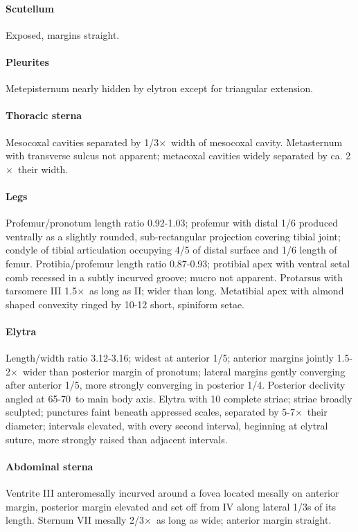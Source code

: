 \documentclass[fleqn,10pt,lineno]{wlpeerj} %
\newcommand{\td}{\textdegree~}
\newcommand{\x}{$\times$~}
\begin{document}
			\paragraph{Scutellum}
				Exposed, margins straight.
			\paragraph{Pleurites}
				Metepisternum nearly hidden by elytron except for triangular extension.
			\paragraph{Thoracic sterna} 
				Mesocoxal cavities separated by 1/3\x width of mesocoxal cavity. 
				Metasternum with transverse sulcus not apparent; metacoxal cavities widely separated by ca. 2\x their width.
			\paragraph{Legs}
				Profemur/pronotum length ratio 0.92-1.03; profemur with distal 1/6 produced ventrally as a slightly rounded, sub-rectangular projection covering tibial joint; condyle of tibial articulation occupying 4/5 of distal surface and 1/6 length of femur. 
				Protibia/profemur length ratio 0.87-0.93; protibial apex with ventral setal comb recessed in a subtly incurved groove; mucro not apparent. 
				Protarsus with tarsomere III 1.5\x as long as II; wider than long. 
				Metatibial apex with almond shaped convexity ringed by 10-12 short, spiniform setae.
			\paragraph{Elytra}
				Length/width ratio 3.12-3.16; widest at anterior 1/5; anterior margins jointly 1.5-2\x wider than posterior margin of pronotum; lateral margins gently converging after anterior 1/5, more strongly converging in posterior 1/4. 
				Posterior declivity angled at 65-70\td to main body axis. Elytra with 10 complete striae; striae broadly sculpted; punctures faint beneath appressed scales, separated by 5-7\x their diameter; intervals elevated, with every second interval, beginning at elytral suture, more strongly raised than adjacent intervals.
			\paragraph{Abdominal sterna}
				Ventrite III anteromesally incurved around a fovea located mesally on anterior margin, posterior margin elevated and set off from IV along lateral 1/3s of its length. 
				Sternum VII mesally 2/3\x as long as wide; anterior margin straight.
\end{document}

